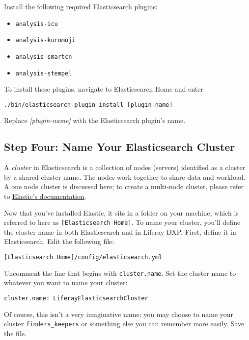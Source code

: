 Install the following required Elasticsearch plugins:

\begin{itemize}
\tightlist
\item
  \texttt{analysis-icu}
\item
  \texttt{analysis-kuromoji}
\item
  \texttt{analysis-smartcn}
\item
  \texttt{analysis-stempel}
\end{itemize}

To install these plugins, navigate to Elasticsearch Home and enter

\begin{verbatim}
./bin/elasticsearch-plugin install [plugin-name]
\end{verbatim}

Replace \emph{{[}plugin-name{]}} with the Elasticsearch plugin's name.

\subsection{Step Four: Name Your Elasticsearch
Cluster}\label{step-four-name-your-elasticsearch-cluster-1}

A \emph{cluster} in Elasticsearch is a collection of nodes (servers)
identified as a cluster by a shared cluster name. The nodes work
together to share data and workload. A one node cluster is discussed
here; to create a multi-node cluster, please refer to
\href{https://www.elastic.co/guide/index.html}{Elastic's documentation}.

Now that you've installed Elastic, it sits in a folder on your machine,
which is referred to here as \texttt{{[}Elasticsearch\ Home{]}}. To name
your cluster, you'll define the cluster name in both Elasticsearch and
in Liferay DXP. First, define it in Elasticsearch. Edit the following
file:

\begin{verbatim}
[Elasticsearch Home]/config/elasticsearch.yml
\end{verbatim}

Uncomment the line that begins with \texttt{cluster.name}. Set the
cluster name to whatever you want to name your cluster:

\begin{verbatim}
cluster.name: LiferayElasticsearchCluster
\end{verbatim}

Of course, this isn't a very imaginative name; you may choose to name
your cluster \texttt{finders\_keepers} or something else you can
remember more easily. Save the file.

